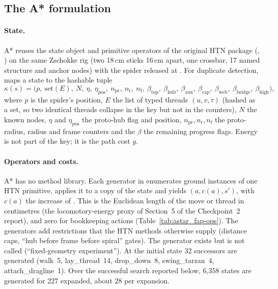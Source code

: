 \subsection{The A* formulation}
\label{sec:astar_fap-astar}

\paragraph{State.}
A* reuses the state object and primitive operators of the original HTN package
(, ) on the same Zschokke rig (two 18\,cm sticks
16\,cm apart, one crossbar, 17 named structure and anchor nodes) with the spider released at
. For duplicate detection,  maps a state to the hashable
tuple
\begin{equation}
  \kappa(s) = \bigl(p,\ \mathrm{set}(E),\ N,\ \eta,\ \eta_{\mathrm{pos}},\ n_{\mathrm{pr}},\ n_{\mathrm{r}},\
  n_{\mathrm{f}},\ \beta_{\mathrm{top}},\ \beta_{\mathrm{hub}},\ \beta_{\mathrm{aux}},\
  \beta_{\mathrm{cap}},\ \beta_{\mathrm{web}},\ \beta_{\mathrm{bridge}},\ \beta_{\mathrm{high}}\bigr),
  \label{eq:astar_fap-key}
\end{equation}
where $p$ is the spider's position, $E$ the list of typed threads $(u,v,\tau)$ (hashed as a set, so
two identical threads collapse in the key but not in the counters), $N$ the known nodes, $\eta$ and
$\eta_{\mathrm{pos}}$ the proto-hub flag and position, $n_{\mathrm{pr}}, n_{\mathrm{r}}, n_{\mathrm{f}}$
the proto-radius, radius and frame counters and the $\beta$ the remaining progress flags. Energy is
not part of the key; it is the path cost $g$.

\paragraph{Operators and costs.}
A* has no method library. Each generator in  enumerates
ground instances of one HTN primitive, applies it to a copy of the state and yields
$(a, c(a), s')$, with $c(a)$ the increase of \code{energy\_expended}. This is the Euclidean
length of the move or thread in centimetres (the locomotory-energy proxy of Section~5 of the
Checkpoint~2 report), and zero for bookkeeping actions (Table~\ref{tab:astar_fap-ops}). The
generators add restrictions that the HTN methods otherwise supply (distance caps, ``hub before
frame before spiral'' gates). The \code{anchor} generator exists but is not called
(``fixed-geometry experiment''). At the initial state 32 successors are generated (walk~5,
lay\_thread~14, drop\_down~8, swing\_tarzan~4, attach\_dragline~1). Over the successful search
reported below, 6,358 states are generated for 227 expanded, about 28 per expansion.

